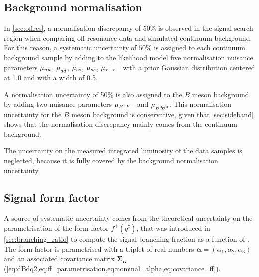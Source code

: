 \subsection{Background normalisation} \label{sec:syst_norm}
In \cref{sec:offres}, a normalisation discrepancy of 50\% is observed in the signal search region when comparing off-resonance data and simulated continuum background.
For this reason, a systematic uncertainty of $50\%$ is assigned to each continuum background sample by adding to the likelihood model five normalisation nuisance parameters $\mu_{u\overline u}$, $\mu_{d\overline d}$, $\mu_{c\overline c}$, $\mu_{s\overline s}$, $\mu_{\tau^+\tau^-}$ with a prior Gaussian distribution centered at 1.0 and with a width of 0.5.

A normalisation uncertainty of 50\% is also assigned to the $B$ meson background by adding two nuisance parameters $\mu_{B^+ {\kern -0.16em B^-}}$ and $\mu_{\BzBzb}$.
This normalisation uncertainty for the $B$ meson background is conservative, given that \cref{sec:sideband} shows that the normalisation discrepancy mainly comes from the continuum background.

The uncertainty on the measured integrated luminosity of the data samples is neglected, because it is fully covered by the background normalisation uncertainty.
\subsection{Signal form factor} \label{sec:syst_ff}
A source of systematic uncertainty comes from the theoretical uncertainty on the parametrisation of the form factor $f^+(q^2)$, that was introduced in \cref{sec:branching_ratio} to compute the signal branching fraction as a function of \qq.
The form factor is parametrised with a triplet of real numbers $\boldsymbol{\alpha}=(\alpha_1,\alpha_2,\alpha_3)$ and an associated covariance matrix $\boldsymbol{\Sigma_\alpha}$ (\cref{eq:dBdq2,eq:ff_parametrisation,eq:nominal_alpha,eq:covariance_ff}).

